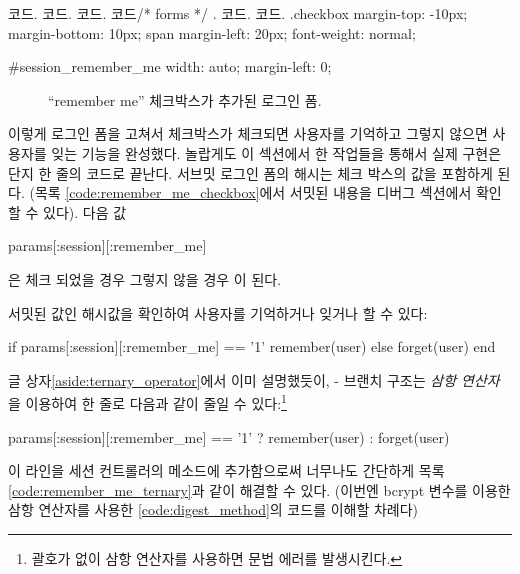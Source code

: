 {{\begin{codelisting}
\begin{code} 코드. 코드. 코드. 코드/* forms */ . 코드. 코드. .checkbox { margin-top: -10px; margin-bottom: 10px; span { margin-left: 20px; font-weight: normal; } } 

#session_remember_me { width: auto; margin-left: 0; } \end{code} \end{codelisting} 

\begin{figure} \begin{center}  \end{center} \caption{``remember me'' 체크박스가 추가된 로그인 폼.\label{fig:login_form_remember_me}} \end{figure} 

이렇게 로그인 폼을 고쳐서 체크박스가 체크되면 사용자를 기억하고 그렇지 않으면 사용자를 잊는 기능을 완성했다. 놀랍게도 이 섹션에서 한 작업들을 통해서 실제 구현은 단지 한 줄의 코드로 끝난다. 서브밋 로그인 폼의  해시는 체크 박스의 값을 포함하게 된다. (목록 \ref{code:remember_me_checkbox}에서 서밋된 내용을 디버그 섹션에서 확인할 수 있다). 다음 값 

\begin{code} params[:session][:remember_me] \end{code} 

\noindent 은 체크 되었을 경우  그렇지 않을 경우 이 된다. 

서밋된 값인  해시값을 확인하여 사용자를 기억하거나 잊거나 할 수 있다: 

\begin{code} if params[:session][:remember_me] == '1' remember(user) else forget(user) end \end{code} 

\noindent 글 상자\ref{aside:ternary_operator}에서 이미 설명했듯이, - 브랜치 구조는 \emph{삼항 연산자}을 이용하여 한 줄로 다음과 같이 줄일 수 있다:\footnote{ 괄호가 없이 삼항 연산자를 사용하면 문법 에러를 발생시킨다.} 

\begin{code} params[:session][:remember_me] == '1' ? remember(user) : forget(user) \end{code} 

\noindent 이 라인을 세션 컨트롤러의  메소드에 추가함으로써 너무나도 간단하게 목록 \ref{code:remember_me_ternary}과 같이 해결할 수 있다. (이번엔 bcrypt  변수를 이용한 삼항 연산자를 사용한 \ref{code:digest_method}의 코드를 이해할 차례다) 

}}
